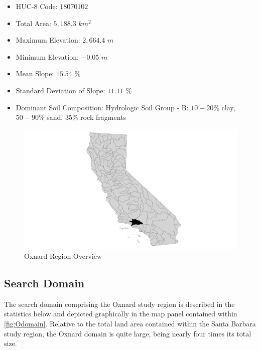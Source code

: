     \begin{itemize}
      \setlength{\itemsep}{0cm}
      \setlength{\parskip}{0cm}
        \item HUC-8 Code: $18070102$
        \item Total Area: $5,188.3$ $km^2$
        \item Maximum Elevation: $2,664.4$ $m$
        \item Minimum Elevation: $-0.05$ $m$
        \item Mean Slope: $15.54$ $\%$
        \item Standard Deviation of Slope: $11.11$ $\%$
        \item Dominant Soil Composition: Hydrologic Soil Group - B: $10-20\%$ clay, $50-90\%$ sand, $35\%$ rock fragments
    \end{itemize}
    
        \begin{figure}[!h]
            \begin{center}
            \includegraphics[width=5.5in]{figures/Oxnard_Overview.png}   
            \caption{Oxnard Region Overview}
            \label{fig:Ooverview}
            \end{center}
        \end{figure}

    \subsection{Search Domain}
    
The search domain comprising the Oxnard study region is described in the statistics below and depicted graphically in the map panel contained within \ref{fig:Odomain}. Relative to the total land area contained within the Santa Barbara study region, the Oxnard domain is quite large, being nearly four times its total size. 
    

